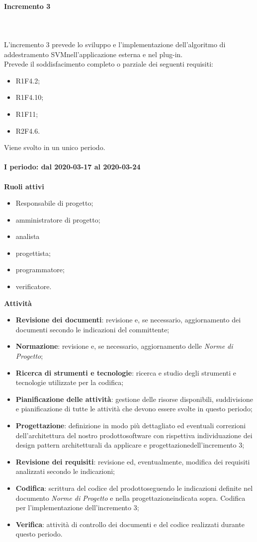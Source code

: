 \paragraph{Incremento 3} \mbox{} \\ \\ 
L'incremento 3 prevede lo sviluppo e l'implementazione dell'algoritmo di addestramento SVM\glosp nell'applicazione esterna e nel plug-in. 
\\Prevede il soddisfacimento completo o parziale dei seguenti requisiti:
\begin{itemize}
	\item R1F4.2;
	\item R1F4.10;
	\item R1F11;
	\item R2F4.6.
\end{itemize}
Viene svolto in un unico periodo.
\mbox{} \\ \\ \textbf{I periodo: dal 2020-03-17 al 2020-03-24} \mbox{} \\ \\
\textbf{Ruoli attivi}
\begin{itemize}
	\item Responsabile di progetto\glo;
	\item amministratore di progetto\glo;
	\item analista
	\item progettista;
	\item programmatore;
	\item verificatore.
\end{itemize}
\textbf{Attività} 
\begin{itemize}
	\item \textbf{Revisione dei documenti}: revisione e, se necessario, aggiornamento dei documenti secondo le indicazioni del committente;
	\item \textbf{Normazione}: revisione e, se necessario, aggiornamento delle \textit{Norme di Progetto};
	\item \textbf{Ricerca di strumenti e tecnologie}: ricerca e studio degli strumenti e tecnologie utilizzate per la codifica;
	\item \textbf{Pianificazione delle attività}: gestione delle risorse disponibili, suddivisione e pianificazione di tutte le attività che devono essere svolte in questo periodo;
	\item \textbf{Progettazione}\glo: definizione in modo più dettagliato ed eventuali correzioni dell'architettura del nostro prodotto\glosp software con rispettiva individuazione dei design pattern architetturali da applicare e progettazione\glosp dell'incremento 3; 
	\item \textbf{Revisione dei requisiti}: revisione ed, eventualmente, modifica dei requisiti analizzati secondo le indicazioni; 
	\item \textbf{Codifica}: scrittura del codice del prodotto\glosp seguendo le indicazioni definite nel documento \textit{Norme di Progetto} e nella progettazione\glosp indicata sopra. Codifica per l'implementazione dell'incremento 3; 
	\item \textbf{Verifica}: attività di controllo dei documenti e del codice realizzati durante questo periodo.
\end{itemize}
